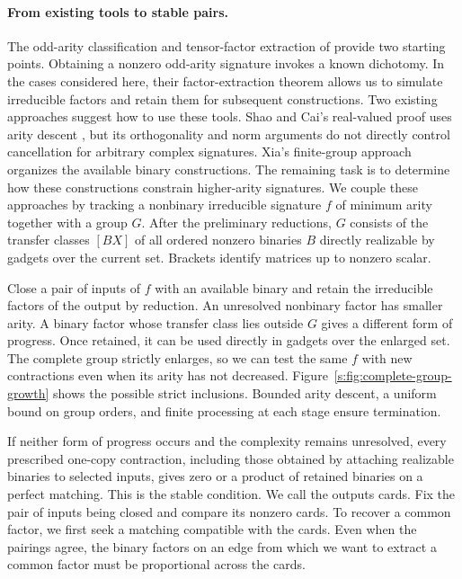 \documentclass[11pt,letterpaper,onecolumn]{article}
\theoremstyle{plain}
\theoremstyle{definition}
\theoremstyle{remark}
\begin{document}
\paragraph{From existing tools to stable pairs.}
The odd-arity classification and tensor-factor extraction of
\cite{MengWangXiaZheng2025} provide two starting points. Obtaining a
nonzero odd-arity signature invokes a known dichotomy. In the cases
considered here, their factor-extraction theorem allows us to simulate
irreducible factors and retain them for subsequent constructions. Two existing approaches suggest
how to use these tools. Shao and Cai's real-valued proof uses arity
descent \cite[Sections~3--4]{ShaoCai2020}, but its orthogonality and norm
arguments do not directly control cancellation for arbitrary complex
signatures. Xia's finite-group approach
\cite[Sections~4--5]{Xia2026FrameworkV1} organizes the available binary
constructions. The remaining task is to determine how these constructions
constrain higher-arity signatures. We couple these approaches by tracking a nonbinary
irreducible signature \(f\) of minimum arity together with a group \(G\).
After the preliminary reductions, \(G\) consists of the transfer classes
\([BX]\) of all ordered nonzero binaries \(B\) directly realizable by
gadgets over the current set. Brackets identify matrices up to nonzero scalar.

Close a pair of inputs of \(f\) with an available binary and retain
the irreducible factors of the output by reduction. An unresolved
nonbinary factor has smaller arity. A binary factor whose transfer class
lies outside \(G\) gives a different form of progress. Once retained,
it can be used directly in gadgets over the enlarged set. The complete
group strictly enlarges, so we can test the same \(f\) with new
contractions even when its arity has not decreased.
Figure~\ref{s:fig:complete-group-growth} shows the possible strict
inclusions. Bounded arity descent, a uniform bound on group orders,
and finite processing at each stage ensure termination.

If neither form of progress occurs and the complexity remains unresolved,
every prescribed one-copy contraction, including those obtained by attaching realizable
binaries to selected inputs, gives zero or a product of retained binaries on a perfect
matching. This is the stable condition. We call the outputs cards.
Fix the pair of inputs being closed and compare its nonzero cards. To
recover a common factor, we first seek a matching compatible with the
cards. Even when the pairings agree, the binary factors on an edge from
which we want to extract a common factor must be proportional across
the cards.
\end{document}
